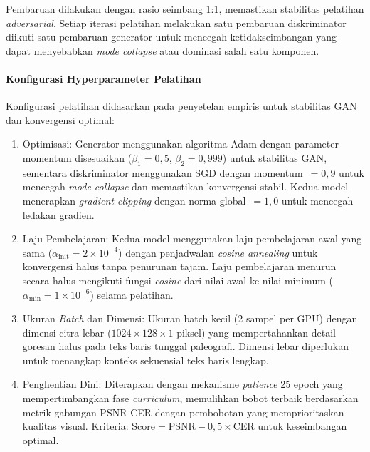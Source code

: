 Pembaruan dilakukan dengan rasio seimbang 1:1, memastikan stabilitas pelatihan \textit{adversarial}. Setiap iterasi pelatihan melakukan satu pembaruan diskriminator diikuti satu pembaruan generator untuk mencegah ketidakseimbangan yang dapat menyebabkan \textit{mode collapse} atau dominasi salah satu komponen.

\paragraph{Konfigurasi Hyperparameter Pelatihan}

Konfigurasi pelatihan didasarkan pada penyetelan empiris untuk stabilitas GAN dan konvergensi optimal:

\begin{enumerate}[label=\alph*., leftmargin=1.5em, labelsep=0.5em, itemindent=0pt, noitemsep, topsep=0pt]
  \item Optimisasi: Generator menggunakan algoritma Adam dengan parameter momentum disesuaikan ($\beta_1=0,5$, $\beta_2=0,999$) untuk stabilitas GAN, sementara diskriminator menggunakan SGD dengan momentum~$=0,9$ untuk mencegah \textit{mode collapse} dan memastikan konvergensi stabil. Kedua model menerapkan \textit{gradient clipping} dengan norma global~$=1,0$ untuk mencegah ledakan gradien.

  \item Laju Pembelajaran: Kedua model menggunakan laju pembelajaran awal yang sama ($\alpha_{\text{init}}=2\times10^{-4}$) dengan penjadwalan \textit{cosine annealing} untuk konvergensi halus tanpa penurunan tajam. Laju pembelajaran menurun secara halus mengikuti fungsi \textit{cosine} dari nilai awal ke nilai minimum ($\alpha_{\text{min}}=1\times10^{-6}$) selama pelatihan.

  \item Ukuran \textit{Batch} dan Dimensi: Ukuran batch kecil (2 sampel per GPU) dengan dimensi citra lebar ($1024 \times 128 \times 1$ piksel) yang mempertahankan detail goresan halus pada teks baris tunggal paleografi. Dimensi lebar diperlukan untuk menangkap konteks sekuensial teks baris lengkap.

  \item Penghentian Dini: Diterapkan dengan mekanisme \textit{patience} 25 epoch yang mempertimbangkan fase \textit{curriculum}, memulihkan bobot terbaik berdasarkan metrik gabungan PSNR-CER dengan pembobotan yang memprioritaskan kualitas visual. Kriteria: $\text{Score} = \text{PSNR} - 0,5 \times \text{CER}$ untuk keseimbangan optimal.
\end{enumerate}

